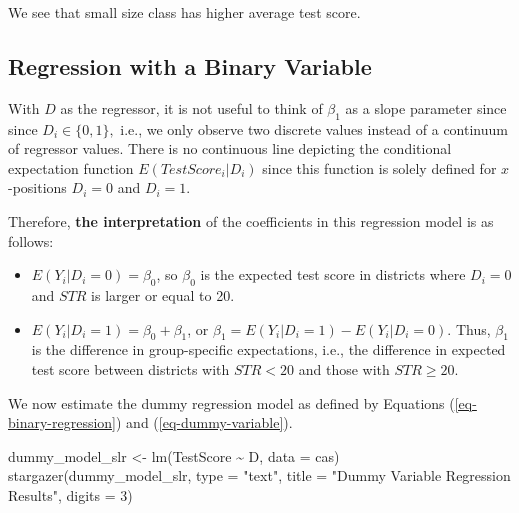 \documentclass[
  12pt,
  letterpaper,
]{scrbook}
\newenvironment{Shaded}{\begin{snugshade}}{\end{snugshade}}
\newcommand{\AttributeTok}[1]{\textcolor[rgb]{0.40,0.45,0.13}{#1}}
\newcommand{\DecValTok}[1]{\textcolor[rgb]{0.68,0.00,0.00}{#1}}
\newcommand{\FunctionTok}[1]{\textcolor[rgb]{0.28,0.35,0.67}{#1}}
\newcommand{\NormalTok}[1]{\textcolor[rgb]{0.00,0.23,0.31}{#1}}
\newcommand{\OtherTok}[1]{\textcolor[rgb]{0.00,0.23,0.31}{#1}}
\newcommand{\SpecialCharTok}[1]{\textcolor[rgb]{0.37,0.37,0.37}{#1}}
\newcommand{\StringTok}[1]{\textcolor[rgb]{0.13,0.47,0.30}{#1}}
\providecommand{\tightlist}{%
  \setlength{\itemsep}{0pt}\setlength{\parskip}{0pt}}
\renewcommand{\tightlist}{\setlength{\itemsep}{0.5\baselineskip}\setlength{\parskip}{0.2\baselineskip}}
\theoremstyle{definition}
\theoremstyle{plain}
\theoremstyle{remark}
\begin{document}
We see that small size class has higher average test score.

\subsection{Regression with a Binary
Variable}\label{regression-with-a-binary-variable}

With \(D\) as the regressor, it is not useful to think of \(\beta_1\) as
a slope parameter since since \(D_i \in \{0,1\},\) i.e., we only observe
two discrete values instead of a continuum of regressor values. There is
no continuous line depicting the conditional expectation function
\(E(TestScore_i | D_i)\) since this function is solely defined for
\(x\)-positions \(D_i = 0\) and \(D_i = 1\).

Therefore, {\textbf{the interpretation}} of the coefficients in this
regression model is as follows:

\begin{itemize}
\tightlist
\item
  \(E(Y_i | D_i = 0) = \beta_0\), so \(\beta_0\) is the expected test
  score in districts where \(D_i = 0\) and \(STR\) is larger or equal to
  20.
\item
  \(E(Y_i | D_i = 1) = \beta_0 + \beta_1\), or
  \(\beta_1 = E(Y_i | D_i = 1) - E(Y_i | D_i = 0).\) Thus, \(\beta_1\)
  is the difference in group-specific expectations, i.e., the difference
  in expected test score between districts with \(STR<20\) and those
  with \(STR \geq 20.\)
\end{itemize}

We now estimate the dummy regression model as defined by Equations
(\ref{eq-binary-regression}) and (\ref{eq-dummy-variable}).

\begin{Shaded}
\begin{Highlighting}[]
\NormalTok{dummy\_model\_slr }\OtherTok{\textless{}{-}} \FunctionTok{lm}\NormalTok{(TestScore }\SpecialCharTok{\textasciitilde{}}\NormalTok{ D, }\AttributeTok{data =}\NormalTok{ cas)}
\FunctionTok{stargazer}\NormalTok{(dummy\_model\_slr, }\AttributeTok{type =} \StringTok{"text"}\NormalTok{, }\AttributeTok{title =} \StringTok{"Dummy Variable Regression Results"}\NormalTok{, }\AttributeTok{digits =} \DecValTok{3}\NormalTok{)}
\end{Highlighting}
\end{Shaded}
\end{document}
